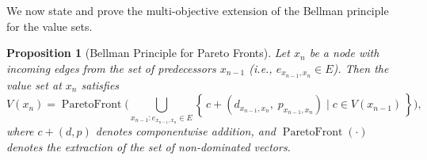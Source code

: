 \documentclass{article}
\newtheorem{proposition}{Proposition}
\begin{document}
We now state and prove the multi-objective extension of the Bellman principle for the value sets.

\begin{proposition}[Bellman Principle for Pareto Fronts]
Let $x_n$ be a node with incoming edges from the set of predecessors $x_{n-1}$ (i.e., $e_{x_{n-1}, x_n} \in E$). Then the value set at $x_n$ satisfies
\begin{equation}\label{eq:bellman-recursion}
V(x_n) = \operatorname{ParetoFront} \Bigg( 
  \bigcup_{x_{n-1}: e_{x_{n-1}, x_n} \in E} \left\{ \, c + (d_{x_{n-1}, x_n},\; p_{x_{n-1}, x_n}) \mid c \in V(x_{n-1}) \, \right\}
\Bigg),
\end{equation}
where $c + (d,p)$ denotes componentwise addition, and $\operatorname{ParetoFront}(\cdot)$ denotes the extraction of the set of non-dominated vectors.
\end{proposition}
\end{document}
